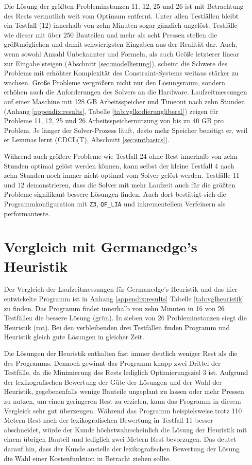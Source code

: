 Die Lösung der größten Probleminstanzen 11, 12, 25 und 26 ist mit Betrachtung des Rests vermutlich weit vom Optimum entfernt.
Unter allen Testfällen bleibt ein Testfall (12) innerhalb von zehn Minuten sogar gänzlich ungelöst.
Testfälle wie dieser mit über 250 Bauteilen und mehr als acht Pressen stellen die größtmöglichen und damit schwierigsten Eingaben aus der Realität dar.
Auch, wenn sowohl Anzahl Unbekannter und Formeln, als auch Größe letzterer linear zur Eingabe steigen (Abschnitt \ref{sec:modellierung}),
scheint die Schwere des Problems mit erhöhter Komplexität des Constraint-Systems weitaus stärker zu wachsen.
Große Probleme vergrößern nicht nur den Lösungsraum, sondern erhöhen auch die Anforderungen des Solvers an die Hardware.
Laufzeitmessungen auf einer Maschine mit 128 GB Arbeitsspeicher und Timeout nach zehn Stunden (Anhang \ref{appendix:results}, Tabelle \ref{tab:vglkodierungliberal}) zeigen für Probleme
11, 12, 25 und 26 Arbeitsspeichernutzung von bis zu 40 GB pro Problem.
Je länger der Solver-Prozess läuft, desto mehr Speicher benötigt er, weil er Lemmas lernt (CDCL(T), Abschnitt \ref{sec:smtbasics}).

Während auch größere Probleme wie Testfall 24 ohne Rest innerhalb von zehn Stunden optimal gelöst werden können, kann selbst der kleine Testfall 4 nach zehn Stunden
noch immer nicht optimal vom Solver gelöst werden.
Testfälle 11 und 12 demonstrieren, dass die Solver mit mehr Laufzeit auch für die größten Probleme signifikant bessere Lösungen finden.
Auch dort bestätigt sich die Programmkonfiguration mit \texttt{Z3}, \texttt{QF\_LIA} und inkrementellem Verfeinern als performanteste.

\section{Vergleich mit Germanedge's Heuristik}
Der Vergleich der Laufzeitmessungen für Germanedge's Heuristik und das hier entwickelte Programm ist in Anhang \ref{appendix:results} Tabelle \ref{tab:vglheuristik} zu finden.
Das Programm findet innerhalb von zehn Minuten in 16 von 26 Testfällen die bessere Lösung (grün).
In sieben von 26 Probleminstanzen siegt die Heuristik (rot).
Bei den verbleibenden drei Testfällen finden Programm und Heuristik gleich gute Lösungen in gleicher Zeit.

Die Lösungen der Heuristik enthalten fast immer deutlich weniger Rest als die des Programms.
Dennoch gewinnt das Programm knapp zwei Drittel der Testfälle, da die Minimierung des Rests lediglich Optimierungsziel 3 ist.
Aufgrund der lexikografischen Bewertung der Güte der Lösungen und der Wahl der Heuristik, gegebenenfalls wenige Bauteile ungeplant zu lassen oder mehr Pressen zu nutzen,
um einen geringeren Rest zu erzielen, kann das Programm in diesem Vergleich sehr gut überzeugen.
Während das Programm beispielsweise trotz 110 Metern Rest nach der lexikografischen Bewertung in Testfall 11 besser abschneidet, würde der Kunde höchstwahrscheinlich die
Lösung der Heuristik mit einem übrigen Bauteil und lediglich zwei Metern Rest bevorzugen.
Das deutet darauf hin, dass der Kunde anstelle der lexikografischen Bewertung der Lösung die Wahl einer Kostenfunktion in Betracht ziehen sollte.

